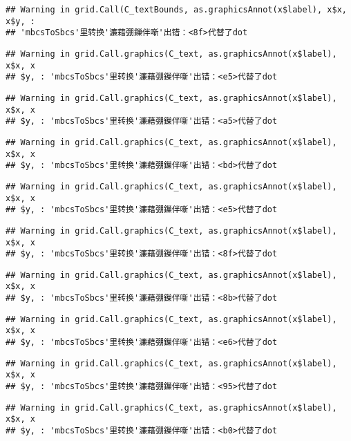 \documentclass[]{article}
\begin{document}
\begin{verbatim}
## Warning in grid.Call(C_textBounds, as.graphicsAnnot(x$label), x$x, x$y, :
## 'mbcsToSbcs'里转换'濂藉弸鏁伴噺'出错：<8f>代替了dot
\end{verbatim}

\begin{verbatim}
## Warning in grid.Call.graphics(C_text, as.graphicsAnnot(x$label), x$x, x
## $y, : 'mbcsToSbcs'里转换'濂藉弸鏁伴噺'出错：<e5>代替了dot
\end{verbatim}

\begin{verbatim}
## Warning in grid.Call.graphics(C_text, as.graphicsAnnot(x$label), x$x, x
## $y, : 'mbcsToSbcs'里转换'濂藉弸鏁伴噺'出错：<a5>代替了dot
\end{verbatim}

\begin{verbatim}
## Warning in grid.Call.graphics(C_text, as.graphicsAnnot(x$label), x$x, x
## $y, : 'mbcsToSbcs'里转换'濂藉弸鏁伴噺'出错：<bd>代替了dot
\end{verbatim}

\begin{verbatim}
## Warning in grid.Call.graphics(C_text, as.graphicsAnnot(x$label), x$x, x
## $y, : 'mbcsToSbcs'里转换'濂藉弸鏁伴噺'出错：<e5>代替了dot
\end{verbatim}

\begin{verbatim}
## Warning in grid.Call.graphics(C_text, as.graphicsAnnot(x$label), x$x, x
## $y, : 'mbcsToSbcs'里转换'濂藉弸鏁伴噺'出错：<8f>代替了dot
\end{verbatim}

\begin{verbatim}
## Warning in grid.Call.graphics(C_text, as.graphicsAnnot(x$label), x$x, x
## $y, : 'mbcsToSbcs'里转换'濂藉弸鏁伴噺'出错：<8b>代替了dot
\end{verbatim}

\begin{verbatim}
## Warning in grid.Call.graphics(C_text, as.graphicsAnnot(x$label), x$x, x
## $y, : 'mbcsToSbcs'里转换'濂藉弸鏁伴噺'出错：<e6>代替了dot
\end{verbatim}

\begin{verbatim}
## Warning in grid.Call.graphics(C_text, as.graphicsAnnot(x$label), x$x, x
## $y, : 'mbcsToSbcs'里转换'濂藉弸鏁伴噺'出错：<95>代替了dot
\end{verbatim}

\begin{verbatim}
## Warning in grid.Call.graphics(C_text, as.graphicsAnnot(x$label), x$x, x
## $y, : 'mbcsToSbcs'里转换'濂藉弸鏁伴噺'出错：<b0>代替了dot
\end{verbatim}
\end{document}
